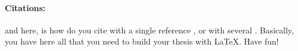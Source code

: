 \vspace{1cm} %

\paragraph{Citations:} and here, is how do you cite with a single reference \cite{harik1999compact}, or with several \cite{harik1999compact, goldberg1988genetic}. Basically, you have here all that you need to build your thesis with LaTeX. Have fun!